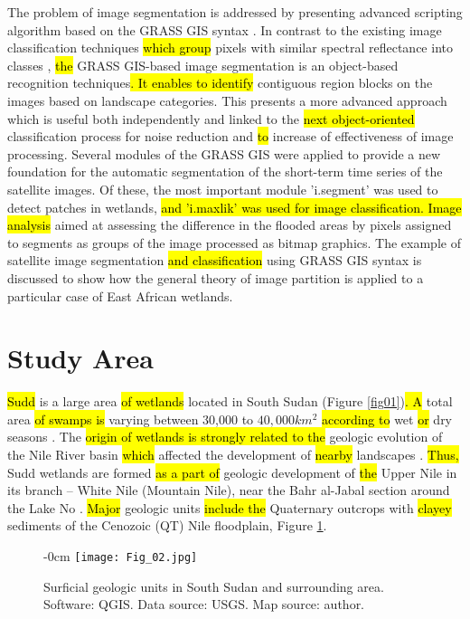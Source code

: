 \documentclass[sustainability,article,submit,pdftex,moreauthors]{Definitions/mdpi}
\begin{document}
The problem of image segmentation is addressed by presenting advanced scripting algorithm based on the GRASS GIS syntax \cite{Lemenkova202125,jmse11040871,HOFIERKA2009387,technologies11020046}. In contrast to the existing image classification techniques \hl{which group} pixels with similar spectral reflectance into classes \cite{DIVITTORIO20181,info14040249,Campos,Lemenkova202229}, \hl{the }GRASS GIS-based image segmentation is an object-based recognition techniques\hl{. It enables to identify} contiguous region blocks on the images based on landscape categories. This presents a more advanced approach which is useful both independently and linked to the \hl{next object-oriented }classification process for noise reduction and \hl{to }increase of effectiveness of image processing. Several modules of the GRASS GIS were applied to provide\hl{ }a new foundation for the automatic segmentation of the short-term time series of the satellite images. Of these, the most important module 'i.segment' was used to detect patches in wetlands, \hl{and 'i.maxlik' was used for image classification. Image analysis} aimed at assessing the difference in the flooded areas by pixels assigned to segments as groups of the image processed as bitmap graphics. The example of satellite image segmentation \hl{and classification }using GRASS GIS syntax is discussed\hl{ }to show how the general theory of image partition is applied to a particular case of East African wetlands.

\section{Study Area}

\hl{Sudd} is a large area \hl{of wetlands }located in South Sudan (Figure \ref{fig01})\hl{. A} total area \hl{of swamps is }varying between 30,000 to $40,000 km^2$ \hl{according to} wet \hl{or} dry seasons \cite{MohamedSavenije}. The \hl{origin of wetlands is strongly related to the }geologic evolution of the Nile River basin \hl{which }affected the development of\hl{ nearby} landscapes \cite{Adamson}. \hl{Thus, }Sudd wetlands are formed \hl{as a part of }geologic development of \hl{the }Upper Nile in its branch -- White Nile (Mountain Nile), near the Bahr al-Jabal section around the Lake No \cite{Broun}. \hl{Major} geologic units \hl{include the }Quaternary outcrops with\hl{ clayey }sediments of the Cenozoic (QT) Nile floodplain, Figure \ref{fig02}.  

\begin{figure}[H]
\begin{adjustwidth}{-\extralength}{0cm}
	\hspace{130pt}\texttt{[image: Fig\_02.jpg]}
\end{adjustwidth}
\caption{Surficial geologic units in South Sudan and surrounding area. Software: QGIS. Data source: USGS. Map source: author.
\label{fig02}}
\end{figure}
\end{document}

